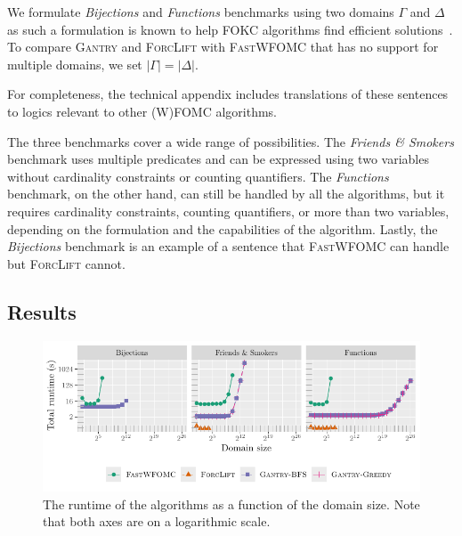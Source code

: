 \documentclass[a4paper,UKenglish,cleveref, autoref, thm-restate]{lipics-v2021}
\newcommand{\Cranetwo}{\textsc{Gantry}}
\newcommand{\friends}{\emph{Friends \& Smokers}}
\newcommand{\functions}{\emph{Functions}}
\newcommand{\bijections}{\emph{Bijections}}
\begin{document}
\begin{remark*}
  We formulate \bijections{} and \functions{} benchmarks using two domains
  $\Gamma$ and $\Delta$ as such a formulation is known to help FOKC algorithms
  find efficient solutions~\cite{DBLP:conf/kr/DilkasB23}. To compare \Cranetwo{}
  and \textsc{ForcLift} with \textsc{FastWFOMC} that has no support for multiple
  domains, we set $|\Gamma| = |\Delta|$.
\end{remark*}

\begin{remark*}
  For completeness, the technical appendix includes translations of these
  sentences to logics relevant to other (W)FOMC algorithms.
\end{remark*}

The three benchmarks cover a wide range of possibilities. The \friends{}
benchmark uses multiple predicates and can be expressed using two variables
without cardinality constraints or counting quantifiers. The \functions{}
benchmark, on the other hand, can still be handled by all the algorithms, but it
requires cardinality constraints, counting quantifiers, or more than two
variables, depending on the formulation and the capabilities of the algorithm.
Lastly, the \bijections{} benchmark is an example of a sentence that
\textsc{FastWFOMC} can handle but \textsc{ForcLift} cannot.

\subsection{Results}

\begin{figure}[t]
  \centering
  \includegraphics{plot.pdf}
  \caption{The runtime of the algorithms as a function of the domain size. Note
    that both axes are on a logarithmic scale.}\label{fig:plot}
\end{figure}
\end{document}
